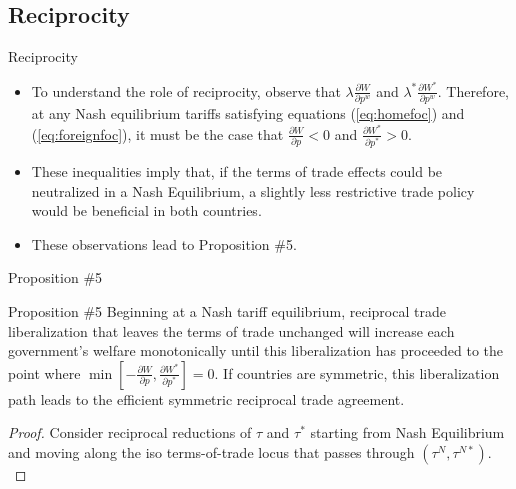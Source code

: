 \documentclass[aspectratio=169]{beamer}
\begin{document}
\subsection{Reciprocity}


\begin{frame}{Reciprocity}

\begin{itemize}
    \item<1-> To understand the role of reciprocity, observe that $ \lambda \frac{\partial W}{\partial p^{w}} $ and $ \lambda^{*} \frac{\partial W^{*}}{\partial p^{w}} $.  Therefore, at any Nash equilibrium tariffs satisfying equations (\ref{eq:homefoc}) and (\ref{eq:foreignfoc}), it must be the case that $ \frac{\partial W}{\partial p} < 0 $ and $ \frac{\partial W^{*}}{\partial p^{*}} > 0 $.
    \item<2-> These inequalities imply that, if the terms of trade effects could be neutralized in a Nash Equilibrium, a slightly less restrictive trade policy would be beneficial in both countries.
    \item<3-> These observations lead to Proposition \#5.
\end{itemize}
    
\end{frame}


\begin{frame}{Proposition \#5}

\begin{theorem}{Proposition \#5}
    Beginning at a Nash tariff equilibrium, reciprocal trade liberalization that leaves the terms of trade unchanged will increase each government’s welfare monotonically until this liberalization has proceeded to the point where $ \min\left[ -\frac{\partial W}{\partial p}, \frac{\partial W^{*}}{\partial p^{*}} \right] = 0 $.  If countries are symmetric, this liberalization path leads to the efficient symmetric reciprocal trade agreement.
\end{theorem}

\begin{proof}
    Consider reciprocal reductions of $ \tau $ and $ \tau^{*} $ starting from Nash Equilibrium and moving along the iso terms-of-trade locus that passes through $ \left( \tau^{N}, \tau^{N*} \right) $. \\
\end{proof}

\end{frame}
\end{document}
